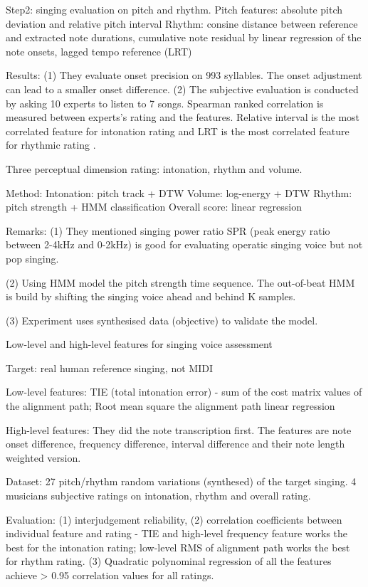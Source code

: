 Step2: singing evaluation on pitch and rhythm. 
Pitch features: absolute pitch deviation and relative pitch interval
Rhythm: consine distance between reference and extracted note durations, cumulative note residual by linear regression of the note onsets, lagged tempo reference (LRT)

Results:
(1) They evaluate onset precision on 993 syllables. The onset adjustment can lead to a smaller onset difference.
(2) The subjective evaluation is conducted by asking 10 experts to listen to 7 songs. Spearman ranked correlation is measured between experts's rating and the features. Relative interval is the most correlated feature for intonation rating and LRT is the most correlated feature for rhythmic rating
.

 Three perceptual dimension rating: intonation, rhythm and volume.

Method:
Intonation: pitch track + DTW 
Volume: log-energy + DTW
Rhythm: pitch strength + HMM classification
Overall score: linear regression

Remarks:
(1) They mentioned singing power ratio SPR (peak energy ratio between 2-4kHz and 0-2kHz) is good for evaluating operatic singing voice but not pop singing.

(2) Using HMM model the pitch strength time sequence. The out-of-beat HMM is build by shifting the singing voice ahead and behind K samples.

(3) Experiment uses synthesised data (objective) to validate the model.

 Low-level and high-level features for singing voice assessment

Target: real human reference singing, not MIDI

Low-level features: TIE (total intonation error) - sum of the cost matrix values of the alignment path; Root mean square the alignment path linear regression

High-level features: They did the note transcription first. The features are note onset difference, frequency difference, interval difference and their note length weighted version.

Dataset: 27 pitch/rhythm random variations (synthesed) of the target singing. 4 musicians subjective ratings on intonation, rhythm and overall rating.

Evaluation: 
(1) interjudgement reliability, 
(2) correlation coefficients between individual feature and rating - TIE and high-level frequency feature works the best for the intonation rating; low-level RMS of alignment path works the best for rhythm rating.
(3) Quadratic polynominal regression of all the features achieve > 0.95 correlation values for all ratings.

